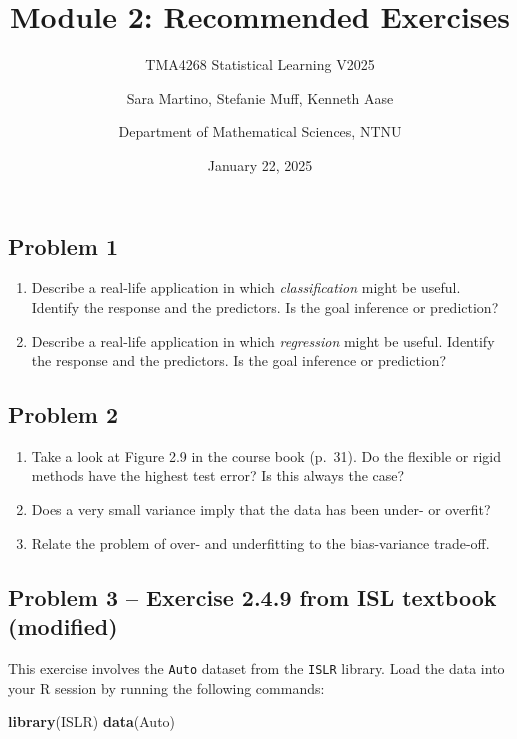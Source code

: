 \documentclass[
]{article}
\title{Module 2: Recommended Exercises}
\subtitle{TMA4268 Statistical Learning V2025}
\author{Sara Martino, Stefanie Muff, Kenneth Aase \and Department of
Mathematical Sciences, NTNU}
\date{January 22, 2025}
\newenvironment{Shaded}{\begin{snugshade}}{\end{snugshade}}
\newcommand{\FunctionTok}[1]{\textcolor[rgb]{0.13,0.29,0.53}{\textbf{#1}}}
\newcommand{\NormalTok}[1]{#1}
\providecommand{\tightlist}{%
  \setlength{\itemsep}{0pt}\setlength{\parskip}{0pt}}
\begin{document}
\maketitle

\subsection{Problem 1}\label{problem-1}

\begin{enumerate}
\def\labelenumi{\alph{enumi})}
\tightlist
\item
  Describe a real-life application in which \emph{classification} might
  be useful. Identify the response and the predictors. Is the goal
  inference or prediction?
\item
  Describe a real-life application in which \emph{regression} might be
  useful. Identify the response and the predictors. Is the goal
  inference or prediction?
\end{enumerate}

\subsection{Problem 2}\label{problem-2}

\begin{enumerate}
\def\labelenumi{\alph{enumi})}
\tightlist
\item
  Take a look at Figure 2.9 in the course book (p.~31). Do the flexible
  or rigid methods have the highest test error? Is this always the case?
\item
  Does a very small variance imply that the data has been under- or
  overfit?
\item
  Relate the problem of over- and underfitting to the bias-variance
  trade-off.
\end{enumerate}

\subsection{Problem 3 -- Exercise 2.4.9 from ISL textbook
(modified)}\label{problem-3-exercise-2.4.9-from-isl-textbook-modified}

This exercise involves the \texttt{Auto} dataset from the \texttt{ISLR}
library. Load the data into your R session by running the following
commands:

\begin{Shaded}
\begin{Highlighting}[]
\FunctionTok{library}\NormalTok{(ISLR)}
\FunctionTok{data}\NormalTok{(Auto)}
\end{Highlighting}
\end{Shaded}
\end{document}
